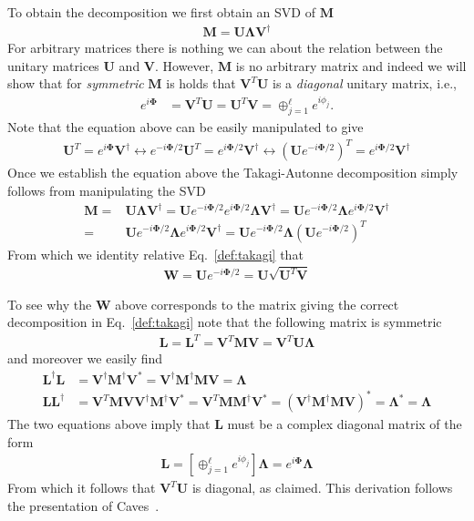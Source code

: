 \documentclass[english,12pt]{shreyasnotes}
\begin{document}
To obtain the decomposition we first obtain an SVD of $\bm{M}$
\begin{align}\label{svd}
\bm{M} = \bm{U} \bm{\Lambda} \bm{V}^\dagger
\end{align}
For arbitrary matrices there is nothing we can about the relation between the unitary matrices $\bm{U}$ and $\bm{V}$. However, $\bm{M}$ is no arbitrary matrix and indeed we will show that for \emph{symmetric} $\bm{M}$ is holds that $\bm{V}^T \bm{U}$ is a \emph{diagonal} unitary matrix, i.e.,
\begin{align}\label{eq:diagprof}
e^{i \bm{\Phi}} &= \bm{V}^T \bm{U} = \bm{U}^T \bm{V} = \oplus_{j=1}^\ell e^{i \phi_j }. 
\end{align}
Note that the equation above can be easily manipulated to give
\begin{align}\label{lemma}
\bm{U}^T = e^{i \bm{\Phi}} \bm{V}^\dagger \longleftrightarrow e^{-i \bm{\Phi}/2} \bm{U}^T = e^{i \bm{\Phi}/2} \bm{V}^\dagger  \longleftrightarrow \left(\bm{U} e^{-i \bm{\Phi}/2} \right)^T =  e^{i \bm{\Phi}/2} \bm{V}^\dagger
\end{align}
Once we establish the equation above the Takagi-Autonne decomposition simply follows from manipulating the SVD
\begin{align}
\bm{M} =& \bm{U} \bm{\Lambda} \bm{V}^\dagger = \bm{U} e^{-i \bm{\Phi}/ 2} e^{i \bm{\Phi}/ 2} \bm{\Lambda} \bm{V}^\dagger = \bm{U} e^{-i \bm{\Phi}/ 2}  \bm{\Lambda} e^{i \bm{\Phi}/ 2} \bm{V}^\dagger  
\\=& \bm{U} e^{-i \bm{\Phi}/ 2}  \bm{\Lambda} e^{i \bm{\Phi}/ 2} \bm{V}^\dagger =  \bm{U} e^{-i \bm{\Phi}/ 2}  \bm{\Lambda} (\bm{U} e^{-i \bm{\Phi}/ 2} )^T
\end{align}
From which we identity relative Eq.~\eqref{def:takagi} that 
\begin{align}
\bm{W} = \bm{U} e^{-i \bm{\Phi}/ 2}  = \bm{U} \sqrt{\bm{U}^T \bm{V}}
\end{align}

To see why the $\bm{W}$ above corresponds to the matrix giving the correct decomposition in Eq.~\eqref{def:takagi} note that the following matrix is symmetric
\begin{align}
\bm{L} = \bm{L}^T = \bm{V}^T \bm{M} \bm{V} = \bm{V}^T \bm{U} \bm{\Lambda}
\end{align}
and moreover we easily find
\begin{align}
\bm{L}^\dagger \bm{L} &= \bm{V}^\dagger \bm{M}^\dagger \bm{V}^*  = \bm{V}^\dagger \bm{M}^\dagger \bm{M} \bm{V} =  \bm{\Lambda}\\
\bm{L}\bm{L}^\dagger &=  \bm{V}^T \bm{M} \bm{V} \bm{V}^\dagger \bm{M}^\dagger \bm{V}^* = \bm{V}^T \bm{M} \bm{M} ^\dagger \bm{V}^* = (\bm{V}^\dagger \bm{M}^\dagger \bm{M}  \bm{V})^* =    \bm{\Lambda}^* =  \bm{\Lambda}
\end{align}
The two equations above imply that $\bm{L}$ must be a complex diagonal matrix of the form
\begin{align}
\bm{L} = \left[\oplus_{j=1}^\ell e^{i \phi_j } \right] \bm{\Lambda} =  e^{i \bm{\Phi}} \bm{\Lambda}
\end{align}
From which it follows that $\bm{V}^T \bm{U}$ is diagonal, as claimed. This derivation follows the presentation of Caves~\cite{cavesnote}.
\end{document}
